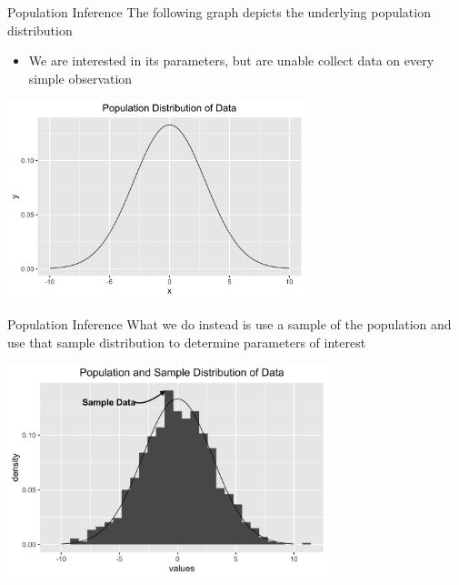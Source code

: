 \documentclass{beamer}
\begin{document}
\begin{frame}{Population Inference}
	The following graph depicts the underlying population distribution
	\begin{itemize}
		\item We are interested in its parameters, but are unable collect data on every simple observation
	\end{itemize}
	\begin{center}
		\includegraphics[width=0.65\textwidth]{normdistn}
	\end{center}
\end{frame}

\begin{frame}{Population Inference}
	What we do instead is use a sample of the population and use that sample distribution to determine parameters of interest
	\begin{center}
		\includegraphics[width=0.7\textwidth]{normdistnsamplehist}
	\end{center}
\end{frame}
\end{document}
